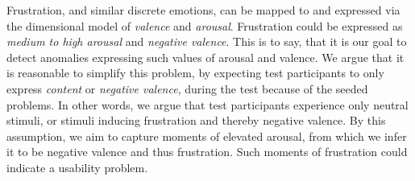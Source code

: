 Frustration, and similar discrete emotions, can be mapped to and expressed via the dimensional model of \textit{valence}
and \textit{arousal}. Frustration could be expressed as \textit{medium to high arousal} and \textit{negative
  valence}. This is to say, that it is our goal to detect anomalies expressing such values of arousal and
valence. We argue that it is reasonable to simplify this problem, by expecting test participants to only
express \textit{content} or \textit{negative valence}, during the test because of the seeded problems. In other words, we argue that test participants experience only neutral stimuli, or stimuli inducing frustration and thereby negative valence. By this assumption, we
aim to capture moments of elevated arousal, from which we infer it to be negative valence and thus frustration.
Such moments of frustration could indicate a usability problem.


